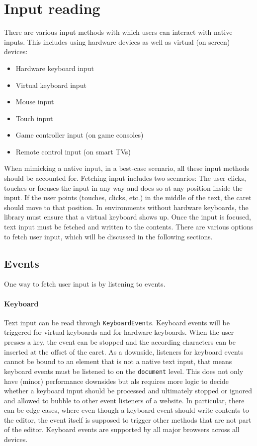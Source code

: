 
\section{Input reading}

There are various input methods with which users can interact with native inputs. This includes using hardware devices as well as virtual (on screen) devices:

\begin{itemize} 
\item Hardware keyboard input
\item Virtual keyboard input
\item Mouse input
\item Touch input
\item Game controller input (on game consoles)
\item Remote control input (on smart TVs)
\end{itemize}

When mimicking a native input, in a best-case scenario, all these input methods should be accounted for. Fetching input includes two scenarios: The user clicks, touches or focuses the input in any way and does so at any position inside the input. If the user points (touches, clicks, etc.) in the middle of the text, the caret should move to that position. In environments without hardware keyboards, the library must ensure that a virtual keyboard shows up. Once the input is focused, text input must be fetched and written to the contents. There are various options to fetch user input, which will be discussed in the following sections.

\subsection{Events} 

One way to fetch user input is by listening to events.

\paragraph{Keyboard} Text input can be read through \texttt{KeyboardEvent}s. Keyboard events will be triggered for virtual keyboards and for hardware keyboards. When the user presses a key, the event can be stopped and the according characters can be inserted at the offset of the caret. As a downside, listeners for keyboard events cannot be bound to an element that is not a native text input, that means keyboard events must be listened to on the \texttt{document} level. This does not only have (minor) performance downsides but als requires more logic to decide whether a keyboard input should be processed and ultimately stopped or ignored and allowed to bubble to other event listeners of a website. In particular, there can be edge cases, where even though a keyboard event should write contents to the editor, the event itself is supposed to trigger other methods that are not part of the editor. Keyboard events are supported by all major browsers across all devices.

